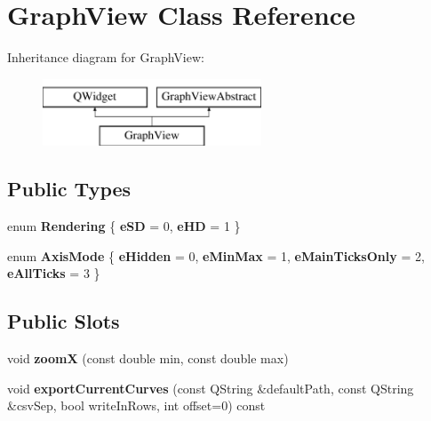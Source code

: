 \hypertarget{class_graph_view}{\section{Graph\-View Class Reference}
\label{class_graph_view}
}
Inheritance diagram for Graph\-View\-:\begin{figure}[H]
\begin{center}
\leavevmode
\includegraphics[height=2.000000cm]{class_graph_view}
\end{center}
\end{figure}
\subsection*{Public Types}
\begin{DoxyCompactItemize}
\item 
enum {\bfseries Rendering} \{ {\bfseries e\-S\-D} = 0, 
{\bfseries e\-H\-D} = 1
 \}
\item 
enum {\bfseries Axis\-Mode} \{ {\bfseries e\-Hidden} = 0, 
{\bfseries e\-Min\-Max} = 1, 
{\bfseries e\-Main\-Ticks\-Only} = 2, 
{\bfseries e\-All\-Ticks} = 3
 \}
\end{DoxyCompactItemize}
\subsection*{Public Slots}
\begin{DoxyCompactItemize}
\item 
\hypertarget{class_graph_view_a50ce873ca759e1e7367e3fa83a415e2e}{void {\bfseries zoom\-X} (const double min, const double max)}\label{class_graph_view_a50ce873ca759e1e7367e3fa83a415e2e}

\item 
\hypertarget{class_graph_view_a3cceca3be66a74c346a07cf9e07c15d6}{void {\bfseries export\-Current\-Curves} (const Q\-String \&default\-Path, const Q\-String \&csv\-Sep, bool write\-In\-Rows, int offset=0) const }\label{class_graph_view_a3cceca3be66a74c346a07cf9e07c15d6}

\end{DoxyCompactItemize}
